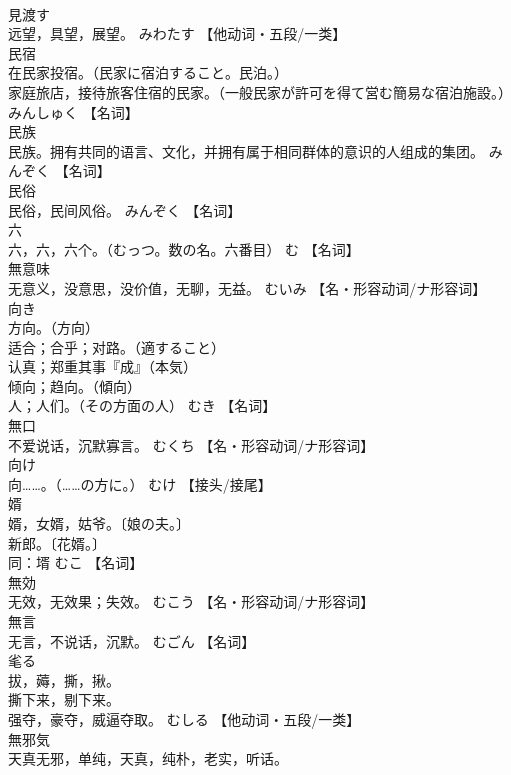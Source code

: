 \documentclass[8pt]{extreport}
\begin{document}
\begin{CJK}{UTF8}{min}
\\	見渡す	
\\	远望，具望，展望。	みわたす		【他动词・五段/一类】
\\	民宿	
\\	在民家投宿。（民家に宿泊すること。民泊。） 
\\	家庭旅店，接待旅客住宿的民家。（一般民家が許可を得て営む簡易な宿泊施設。）	みんしゅく		【名词】
\\	民族	
\\	民族。拥有共同的语言、文化，并拥有属于相同群体的意识的人组成的集团。	みんぞく		【名词】
\\	民俗	
\\	民俗，民间风俗。	みんぞく		【名词】
\\	六	
\\	六，六，六个。（むっつ。数の名。六番目）	む		【名词】
\\	無意味	
\\	无意义，没意思，没价值，无聊，无益。	むいみ		【名・形容动词/ナ形容词】
\\	向き	
\\	方向。（方向） 
\\	适合；合乎；对路。（適すること） 
\\	认真；郑重其事『成』（本気） 
\\	倾向；趋向。（傾向） 
\\	人；人们。（その方面の人）	むき		【名词】
\\	無口	
\\	不爱说话，沉默寡言。	むくち		【名・形容动词/ナ形容词】
\\	向け	
\\	向……。（……の方に。）	むけ		【接头/接尾】
\\	婿	
\\	婿，女婿，姑爷。〔娘の夫。〕 
\\	新郎。〔花婿。〕 
\\	同：壻	むこ		【名词】
\\	無効	
\\	无效，无效果；失效。	むこう		【名・形容动词/ナ形容词】
\\	無言	
\\	无言，不说话，沉默。	むごん		【名词】
\\	毟る	
\\	拔，薅，撕，揪。 
\\	撕下来，剔下来。 
\\	强夺，豪夺，威逼夺取。	むしる		【他动词・五段/一类】
\\	無邪気	
\\	天真无邪，单纯，天真，纯朴，老实，听话。 

\end{CJK}
\end{document}
